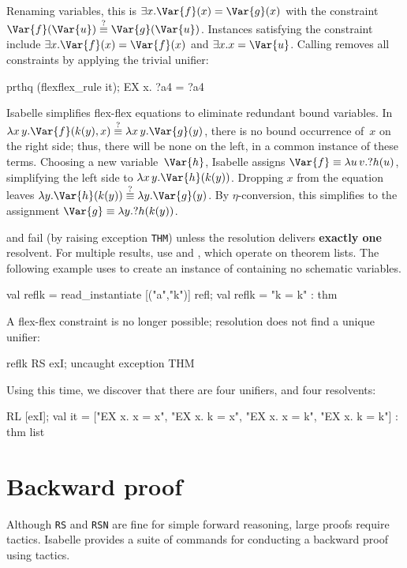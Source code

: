 \noindent
Renaming variables, this is $\exists x.\Var{f}(x)=\Var{g}(x)$ with
the constraint ${\Var{f}(\Var{u})\qeq\Var{g}(\Var{u})}$.  Instances
satisfying the constraint include $\exists x.\Var{f}(x)=\Var{f}(x)$ and
$\exists x.x=\Var{u}$.  Calling  removes all
constraints by applying the trivial unifier:
\begin{ttbox} 
prthq (flexflex_rule it);
{\out EX x. ?a4 = ?a4}
\end{ttbox} 
Isabelle simplifies flex-flex equations to eliminate redundant bound
variables.  In $\lambda x\,y.\Var{f}(k(y),x) \qeq \lambda x\,y.\Var{g}(y)$,
there is no bound occurrence of~$x$ on the right side; thus, there will be
none on the left, in a common instance of these terms.  Choosing a new
variable~$\Var{h}$, Isabelle assigns $\Var{f}\equiv \lambda u\,v.?h(u)$,
simplifying the left side to $\lambda x\,y.\Var{h}(k(y))$.  Dropping $x$
from the equation leaves $\lambda y.\Var{h}(k(y)) \qeq \lambda
y.\Var{g}(y)$.  By $\eta$-conversion, this simplifies to the assignment
$\Var{g}\equiv\lambda y.?h(k(y))$.

\begin{warn}
 and  fail (by raising exception {\tt THM}) unless
the resolution delivers {\bf exactly one} resolvent.  For multiple results,
use  and , which operate on theorem lists.  The
following example uses  to create an instance
of  containing no schematic variables.
\begin{ttbox} 
val reflk = read_instantiate [("a","k")] refl;
{\out val reflk = "k = k" : thm}
\end{ttbox}

\noindent
A flex-flex constraint is no longer possible; resolution does not find a
unique unifier:
\begin{ttbox} 
reflk RS exI;
{\out uncaught exception THM}
\end{ttbox}
Using  this time, we discover that there are four unifiers, and
four resolvents:
\begin{ttbox} 
[reflk] RL [exI];
{\out val it = ["EX x. x = x", "EX x. k = x",}
{\out           "EX x. x = k", "EX x. k = k"] : thm list}
\end{ttbox} 
\end{warn}


\section{Backward proof}
Although {\tt RS} and {\tt RSN} are fine for simple forward reasoning,
large proofs require tactics.  Isabelle provides a suite of commands for
conducting a backward proof using tactics.


